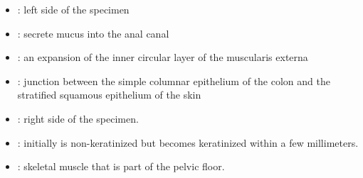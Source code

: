 \begin{itemize}
  \begin{multicols}{2}
  \begin{itemize}
      \item {}: left side of the specimen
      
      \begin{center}
      \end{center}
      
      \item {}: secrete mucus into the anal canal
      
      \begin{center}
      \end{center}
      
      \item {}: an expansion of the inner circular layer of the muscularis externa
      
      \begin{center}
      \end{center}
      
      \item {}: junction between the simple columnar epithelium of the colon and the stratified squamous epithelium of the skin
      
      \begin{center}
      \end{center}
      
      \item {}: right side of the specimen. 
      
      \begin{center}
      \end{center}
      
      \item {}:  initially is non-keratinized but becomes keratinized within a few millimeters.
      
      \begin{center}
      \end{center}
      
      \item {}: skeletal muscle that is part of the pelvic floor.
      

\end{itemize}
\end{multicols}
\end{itemize}

